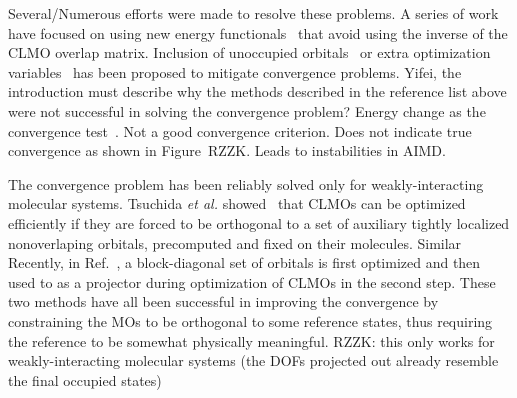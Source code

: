 \documentclass[aps,prl,twocolumn,reprint,amsmath,amssymb]{revtex4-1}
\begin{document}
Several/Numerous efforts were made to resolve these problems. A series of work have focused on using new energy functionals~\cite{mauri1993orbital,kim1995total,ordejon1995linear} that avoid using the inverse of the CLMO overlap matrix. 
Inclusion of unoccupied orbitals~\cite{kim1995total} or extra optimization variables~\cite{burger2008linear,peng2013effective} has been proposed to mitigate convergence problems. 
\new Yifei, the introduction must describe why the methods described in the reference list above were not successful in solving the convergence problem? \old Energy change as the convergence test~\cite{fattebert2000towards, kim1995total, ordejon1995linear}. Not a good convergence criterion. Does not indicate true convergence as shown in Figure~RZZK. Leads to instabilities in AIMD.

The convergence problem has been reliably solved only for weakly-interacting molecular systems. Tsuchida \emph{et al.} showed~\cite{tsuchida2007augmented,tsuchida2008ab} that CLMOs can be optimized efficiently if they are forced to be orthogonal to  a set of auxiliary tightly localized nonoverlaping orbitals, precomputed and fixed on their molecules. Similar Recently, in Ref.~, a block-diagonal set of orbitals is first optimized and then used to as a projector during optimization of CLMOs in the second step. These two methods have all been successful in improving the convergence by constraining the MOs to be orthogonal to some reference states, thus requiring the reference to be somewhat physically meaningful. RZZK: this only works for weakly-interacting molecular systems (the DOFs projected out already resemble the final occupied states)
\end{document}

